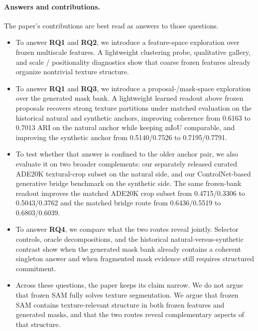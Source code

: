 \paragraph{Answers and contributions.} The paper's contributions are best read as answers to those questions.
\begin{itemize}[leftmargin=1.2em]
\item To answer \textbf{RQ1} and \textbf{RQ2}, we introduce a feature-space exploration over frozen multiscale features. A lightweight clustering probe, qualitative gallery, and scale / positionality diagnostics show that coarse frozen features already organize nontrivial texture structure.
\item To answer \textbf{RQ1} and \textbf{RQ3}, we introduce a proposal-/mask-space exploration over the generated mask bank. A lightweight learned readout above frozen proposals recovers strong texture partitions under matched evaluation on the historical natural and synthetic anchors, improving coherence from 0.6163 to 0.7013 ARI on the natural anchor while keeping mIoU comparable, and improving the synthetic anchor from 0.5140/0.7526 to 0.7195/0.7791.
\item To test whether that answer is confined to the older anchor pair, we also evaluate it on two broader complements: our separately released curated ADE20K textural-crop subset on the natural side, and our ControlNet-based generative bridge benchmark on the synthetic side. The same frozen-bank readout improves the matched ADE20K crop subset from 0.4715/0.3306 to 0.5043/0.3762 and the matched bridge route from 0.6436/0.5519 to 0.6803/0.6039.
\item To answer \textbf{RQ4}, we compare what the two routes reveal jointly. Selector controls, oracle decompositions, and the historical natural-versus-synthetic contrast show when the generated mask bank already contains a coherent singleton answer and when fragmented mask evidence still requires structured commitment.
\item Across these questions, the paper keeps its claim narrow. We do not argue that frozen SAM fully solves texture segmentation. We argue that frozen SAM contains texture-relevant structure in both frozen features and generated masks, and that the two routes reveal complementary aspects of that structure.
\end{itemize}

